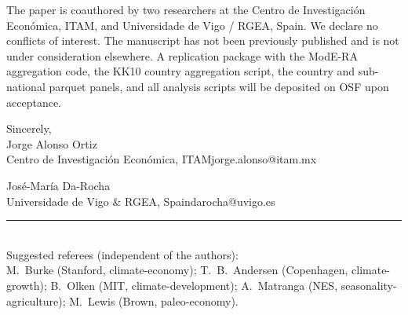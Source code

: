\documentclass[11pt,letterpaper]{article}
\begin{document}
The paper is coauthored by two researchers at the Centro de Investigaci\'on Econ\'omica, ITAM, and Universidade de Vigo / RGEA, Spain. We declare no conflicts of interest. The manuscript has not been previously published and is not under consideration elsewhere. A replication package with the ModE-RA aggregation code, the KK10 country aggregation script, the country and sub-national parquet panels, and all analysis scripts will be deposited on OSF upon acceptance.

\bigskip

\noindent Sincerely,\\[0.4em]
Jorge Alonso Ortiz \\
\small\textcolor{mutedgray}{Centro de Investigaci\'on Econ\'omica, ITAM\quad\textbar\quad jorge.alonso@itam.mx}

\bigskip

\noindent Jos\'e-Mar\'ia Da-Rocha \\
\small\textcolor{mutedgray}{Universidade de Vigo \& RGEA, Spain\quad\textbar\quad darocha@uvigo.es}

\bigskip

\textcolor{mutedgray}{\rule{0.22\linewidth}{0.4pt}}\\[0.2em]
{\footnotesize\textcolor{mutedgray}{Suggested referees (independent of the authors):}\\
M.\ Burke (Stanford, climate-economy);
T.\ B.\ Andersen (Copenhagen, climate-growth);
B.\ Olken (MIT, climate-development);
A.\ Matranga (NES, seasonality-agriculture);
M.\ Lewis (Brown, paleo-economy).}
\end{document}
